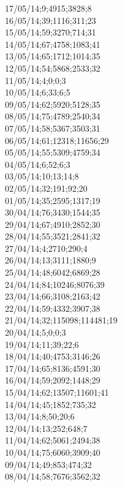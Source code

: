 17/05/14;9;4915;3828;8 \\
16/05/14;39;1116;311;23 \\
15/05/14;59;3270;714;31 \\
14/05/14;67;4758;1083;41 \\
13/05/14;65;1712;1014;35 \\
12/05/14;54;5868;2533;32 \\
11/05/14;4;0;0;3 \\
10/05/14;6;33;6;5 \\
09/05/14;62;5920;5128;35 \\
08/05/14;75;4789;2540;34 \\
07/05/14;58;5367;3503;31 \\
06/05/14;61;12318;11656;29 \\
05/05/14;55;5309;4759;34 \\
04/05/14;6;52;6;3 \\
03/05/14;10;13;14;8 \\
02/05/14;32;191;92;20 \\
01/05/14;35;2595;1317;19 \\
30/04/14;76;3430;1544;35 \\
29/04/14;67;4910;2852;30 \\
28/04/14;55;3521;2841;32 \\
27/04/14;4;2710;290;4 \\
26/04/14;13;3111;1880;9 \\
25/04/14;48;6042;6869;28 \\
24/04/14;84;10246;8076;39 \\
23/04/14;66;3108;2163;42 \\
22/04/14;59;4332;3907;38 \\
21/04/14;32;115098;114481;19 \\
20/04/14;5;0;0;3 \\
19/04/14;11;39;22;6 \\
18/04/14;40;4753;3146;26 \\
17/04/14;65;8136;4591;30 \\
16/04/14;59;2092;1448;29 \\
15/04/14;62;13507;11601;41 \\
14/04/14;45;1852;735;32 \\
13/04/14;8;50;20;6 \\
12/04/14;13;252;648;7 \\
11/04/14;62;5061;2494;38 \\
10/04/14;75;6060;3909;40 \\
09/04/14;49;853;474;32 \\
08/04/14;58;7676;3562;32 \\
